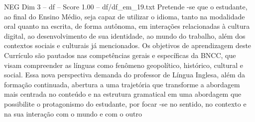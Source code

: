 \begin{textsample}{NEG Dim 3 – df – Score 1.00 – df/df\_em\_19.txt}
Pretende -se que o estudante, ao final do Ensino Médio, seja capaz de utilizar o idioma, tanto na modalidade oral quanto na escrita, de forma autônoma, em interações relacionadas à cultura digital, ao desenvolvimento de sua identidade, ao mundo do trabalho, além dos contextos sociais e culturais já mencionados.
Os objetivos de aprendizagem deste Currículo são pautados nas competências gerais e específicas da BNCC, que visam compreender as línguas como fenômeno geopolítico, histórico, cultural e social.
Essa nova perspectiva demanda do professor de Língua Inglesa, além da formação continuada, abertura a uma trajetória que transforme a abordagem mais centrada no conteúdo e na estrutura gramatical em uma abordagem que possibilite o protagonismo do estudante, por focar -se no sentido, no contexto e na sua interação com o mundo e com o outro

\end{textsample}
